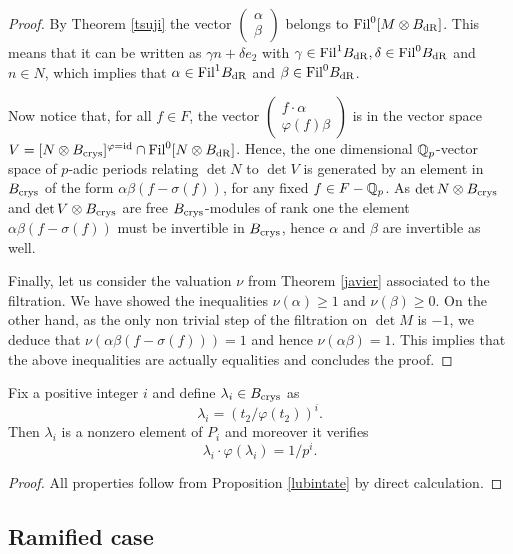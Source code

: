 \begin{proof}
  By Theorem \ref{tsuji} the vector $\begin{pmatrix} \alpha \\
\beta
 \end{pmatrix}$ belongs to $\textnormal{Fil}^0[M \otimes B_{\mathrm{dR}}]$. This means that it can be written as $\gamma n + \delta e_2$ with $\gamma \in \textnormal{Fil}^{1}B_{\mathrm{dR}}, \delta \in \textnormal{Fil}^0 B_{\mathrm{dR}}$ and $n \in N$, which implies that $\alpha \in \textnormal{Fil}^{1}B_{\mathrm{dR}}$ and  $\beta \in \textnormal{Fil}^{0}B_{\mathrm{dR}}$.

  Now notice that, for all $f\in F$, the vector $\begin{pmatrix} f\cdot \alpha \\
\varphi(f)\beta
 \end{pmatrix}$ is in the vector space $V=[N\otimes B_{\textnormal{crys}}]^{\varphi=\mathrm{id}} \cap  \textnormal{Fil}^0[N \otimes B_{\mathrm{dR}}] $. Hence,  the one dimensional $\mathbb{Q}_p$-vector space of $p$-adic periods relating $\det N$ to $\det V$ is generated by an element in $B_{\textnormal{crys}}$ of the form $\alpha \beta (f-\sigma( f) )$, for any fixed $f \in F- \mathbb{Q}_p$. As $\det N\otimes B_{\textnormal{crys}}$ and $\det V\otimes B_{\textnormal{crys}}$ are free $B_{\textnormal{crys}}$-modules of rank one the element $\alpha \beta (f-\sigma( f) )$ must be invertible in $B_{\textnormal{crys}}$, hence $\alpha$ and  $\beta$ are invertible as well.

Finally, let us consider the  valuation $\nu$ from Theorem \ref{javier} associated to the filtration. We have showed the inequalities $\nu ( \alpha) \geq 1$ and  $\nu (  \beta)\geq 0$.
On the other hand, as the only non trivial step of the filtration on $\det M$ is  $-1$, we deduce that $\nu ( \alpha \beta (f-\sigma( f) ))=1$ and hence $\nu ( \alpha \beta)=1$. This implies  that the above inequalities are actually equalities and concludes the proof.
 \end{proof}
\begin{corollary}
\notready\label{brinon}
Fix a positive integer $i$ and define $\lambda_i \in B_{\textnormal{crys}}$ as
\[\lambda_i = (t_2/\varphi(t_2))^i .\]
Then $\lambda_i$ is a nonzero element of  $P_i$ and moreover it verifies
\[\lambda_i \cdot\varphi(\lambda_i) = 1/p^i.\]
\end{corollary}
\begin{proof}
All properties follow from Proposition \ref{lubintate} by direct calculation.
\end{proof}


\subsection*{Ramified case}\label{ramcase}


